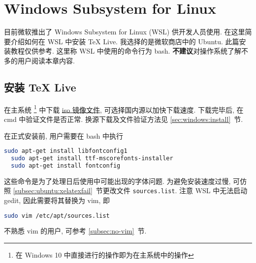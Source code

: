 
\chapter{Windows Subsystem for Linux}

目前微软推出了 Windows Subsystem for Linux (WSL) 供开发人员使用.
在这里简要介绍如何在 WSL 中安装 \TeX{} Live.
我选择的是微软商店中的 Ubuntu.
此篇安装教程仅供参考.
这里称 WSL 中使用的命令行为 \textsf{bash}.
\textbf{不建议}对操作系统了解不多的用户阅读本章内容.

\section{安装 \TeX{} Live}

在主系统%
\footnote{在 Windows 10 中直接进行的操作即为在主系统中的操作}%
中下载
\href{https://mirrors.ctan.org/systems/texlive/Images/texlive2020.iso}{iso 镜像文件},
可选择国内源以加快下载速度.
下载完毕后, 在 \textsf{cmd} 中验证文件是否正常.
换源下载及文件验证方法见 \ref{sec:windows:install}~节.

在正式安装前,
用户需要在 \textsf{bash} 中执行
\begin{lstlisting}[language=bash]
  sudo apt-get install libfontconfig1
  sudo apt-get install ttf-mscorefonts-installer
  sudo apt-get install fontconfig
\end{lstlisting}
这些命令是为了处理日后使用中可能出现的字体问题.
为避免安装速度过慢,
可仿照 \ref{subsec:ubuntu:xelatexfail}~节更改文件 \texttt{sources.list}.
注意 WSL 中无法启动 \textsf{gedit},
因此需要将其替换为 \textsf{vim},
即
\begin{lstlisting}[language=bash]
  sudo vim /etc/apt/sources.list
\end{lstlisting}
不熟悉 \textsf{vim} 的用户,
可参考 \ref{subsec:no-vim}~节.

